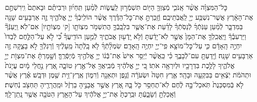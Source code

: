 \documentclass[twoside, openany, parskip=half, 11pt]{book}
\begin{document}
\begin{footnotesize}
\begin{multicols}{2}
כׇּל־הַמִּצְוָ֗ה אֲשֶׁ֨ר אָֽנֹכִ֧י מְֿצַוְּךָ֛ הַיּ֖וֹם תִּשְׁמְֿר֣וּן לַֽעֲשׂ֑וֹת לְֿמַ֨עַן תִּֽחְי֜וּן וּרְבִיתֶ֗ם וּבָאתֶם֙ וִֽירִשְׁתֶּ֣ם אֶת־הָאָ֔רֶץ אֲשֶׁר־נִשְׁבַּ֥ע יְיָ֖ לַֽאֲבֹֽתֵיכֶֽם׃ וְֿזָֽכַרְתָּ֣ אֶת־כׇּל־הַדֶּ֗רֶךְ אֲשֶׁ֨ר הוֹלִֽיכְֿךָ֜ יְיָ֧ אֱלֹהֶ֛יךָ זֶ֛ה אַרְבָּעִ֥ים שָׁנָ֖ה בַּמִּדְבָּ֑ר לְֿמַ֨עַן עַנֹּֽתְֿךָ֜ לְֿנַסֹּֽתְֿךָ֗ לָדַ֜עַת אֶת־אֲשֶׁ֧ר בִּלְבָֽבְֿךָ֛ הֲתִשְׁמֹ֥ר מִצְוֹתָ֖ו [ק‘ מִצְוֹתָ֖יו] אִם־לֹֽא׃ וַֽיְעַנְּֿךָ֘ וַיַּרְעִבֶ֒ךָ֒ וַיַּֽאֲכִֽלְךָ֤ אֶת־הַמָּן֙ אֲשֶׁ֣ר לֹֽא־יָדַ֔עְתָּ וְֿלֹ֥א יָֽדְֿע֖וּן אֲבֹתֶ֑יךָ לְֿמַ֣עַן הוֹדִֽיעֲךָ֗ כִּ֠י לֹ֣א עַל־הַלֶּ֤חֶם לְֿבַדּוֹ֙ יִחְיֶ֣ה הָֽאָדָ֔ם כִּ֛י עַל־כׇּל־מוֹצָ֥א פִֽי־יְיָ֖ יִחְיֶ֥ה הָֽאָדָֽם׃  שִׂמְלָ֨תְֿךָ֜ לֹ֤א בָֽלְֿתָה֙ מֵֽעָלֶ֔יךָ וְֿרַגְלְֿךָ֖ לֹ֣א בָצֵ֑קָה זֶ֖ה אַרְבָּעִ֥ים שָׁנָֽה׃ וְֿיָֽדַעְתָּ֖ עִם־לְֿבָבֶ֑ךָ כִּ֗י כַּֽאֲשֶׁ֨ר יְֿיַסֵּ֥ר אִישׁ֙ אֶת־בְּֿֿנ֔וֹ יְיָ֥ אֱלֹהֶ֖יךָ מְֿיַסְּֿרֶֽךָּ׃ וְֿשָׁ֣מַרְתָּ֔ אֶת־מִצְוֹ֖ת יְיָ֣ אֱלֹהֶ֑יךָ לָלֶ֥כֶת בִּדְרָכָ֖יו וּלְיִרְאָ֥ה אֹתֽוֹ׃ כִּ֚י יְיָ֣ אֱלֹהֶ֔יךָ מְֿבִֽיאֲךָ֖ אֶל־אֶ֣רֶץ טוֹבָ֑ה אֶ֚רֶץ נַ֣חֲלֵי מָ֔יִם עֲיָנֹת֙ וּתְהֹמֹ֔ת יֹֽצְֿאִ֥ים בַּבִּקְעָ֖ה וּבָהָֽר׃ אֶ֤רֶץ חִטָּה֙ וּשְׂעֹרָ֔ה וְֿגֶ֥פֶן וּתְאֵנָ֖ה וְֿרִמּ֑וֹן אֶֽרֶץ־זֵ֥ית שֶׁ֖מֶן וּדְבָֽשׁ׃ אֶ֗רֶץ אֲשֶׁ֨ר לֹ֤א בְֿמִסְכֵּנֻת֙ תֹּֽאכַל־בָּ֣הּ לֶ֔חֶם לֹֽא־תֶחְסַ֥ר כֹּ֖ל בָּ֑הּ אֶ֚רֶץ אֲשֶׁ֣ר אֲבָנֶ֣יהָ בַרְזֶ֔ל וּמֵֽהֲרָרֶ֖יהָ תַּחְצֹ֥ב נְֿחֽשֶׁת׃ וְֿאָֽכַלְתָּ֖ וְֿשָׂבָ֑עְֿתָּ וּבֵֽרַכְתָּ֙ אֶת־יְיָ֣ אֱלֹהֶ֔יךָ עַל־הָאָ֥רֶץ הַטֹּבָ֖ה אֲשֶׁ֥ר נָֽתַן־לָֽךְ׃


\end{multicols}
\end{footnotesize}
\end{document}
